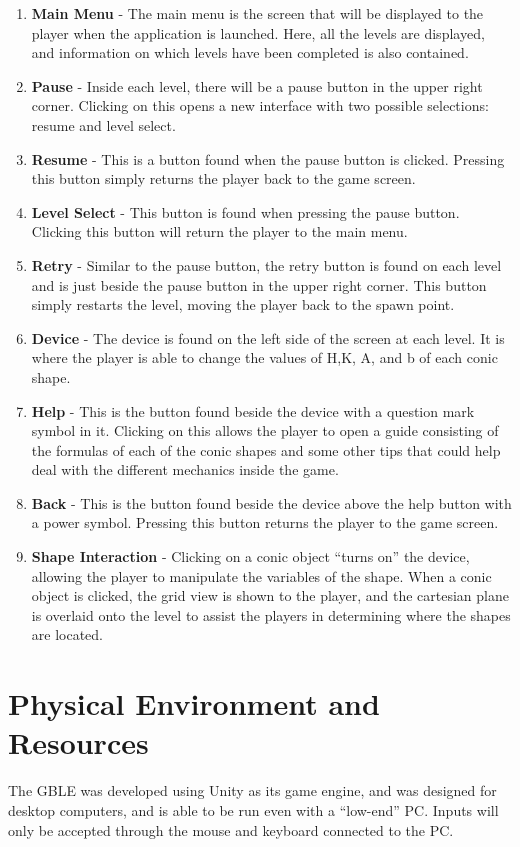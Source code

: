 \begin{enumerate}
    \item \textbf{Main Menu} - The main menu is the screen that will be displayed to the player when the application is launched. Here, all the levels are displayed, and information on which levels have been completed is also contained.
    \item \textbf{Pause} - Inside each level, there will be a pause button in the upper right corner. Clicking on this opens a new interface with two possible selections: resume and level select.
    \item \textbf{Resume} - This is a button found when the pause button is clicked. Pressing this button simply returns the player back to the game screen.
    \item \textbf{Level Select} - This button is found when pressing the pause button. Clicking this button will return the player to the main menu.
    \item \textbf{Retry} - Similar to the pause button, the retry button is found on each level and is just beside the pause button in the upper right corner. This button simply restarts the level, moving the player back to the spawn point.
    \item \textbf{Device} - The device is found on the left side of the screen at each level. It is where the player is able to change the values of H,K, A, and b of each conic shape. 
    \item \textbf{Help} - This is the button found beside the device with a question mark symbol in it. Clicking on this allows the player to open a guide consisting of the formulas of each of the conic shapes and some other tips that could help deal with the different mechanics inside the game.
    \item \textbf{Back} - This is the button found beside the device above the help button with a power symbol. Pressing this button returns the player to the game screen.
    \item \textbf{Shape Interaction} - Clicking on a conic object “turns on” the device, allowing the player to manipulate the variables of the shape. When a conic object is clicked, the grid view is shown to the player, and the cartesian plane is overlaid onto the level to assist the players in determining where the shapes are located.
\end{enumerate}

\section{Physical Environment and Resources}
The GBLE was developed using Unity as its game engine, and was designed for desktop computers, and is able to be run even with a “low-end” PC. Inputs will only be accepted through the mouse and keyboard connected to the PC.


